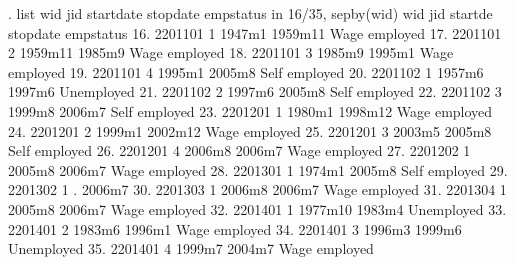 . list wid jid startdate stopdate empstatus in 16/35, sepby(wid)
{\smallskip}
     {\TLC}
     {\VBAR}     wid   jid   startd{\tytilde}e   stopdate       empstatus {\VBAR}
     {\LFTT}
 16. {\VBAR} 2201101     1     1947m1    1959m11   Wage employed {\VBAR}
 17. {\VBAR} 2201101     2    1959m11     1985m9   Wage employed {\VBAR}
 18. {\VBAR} 2201101     3     1985m9     1995m1   Wage employed {\VBAR}
 19. {\VBAR} 2201101     4     1995m1     2005m8   Self employed {\VBAR}
     {\LFTT}
 20. {\VBAR} 2201102     1     1957m6     1997m6      Unemployed {\VBAR}
 21. {\VBAR} 2201102     2     1997m6     2005m8   Self employed {\VBAR}
 22. {\VBAR} 2201102     3     1999m8     2006m7   Self employed {\VBAR}
     {\LFTT}
 23. {\VBAR} 2201201     1     1980m1    1998m12   Wage employed {\VBAR}
 24. {\VBAR} 2201201     2     1999m1    2002m12   Wage employed {\VBAR}
 25. {\VBAR} 2201201     3     2003m5     2005m8   Self employed {\VBAR}
 26. {\VBAR} 2201201     4     2006m8     2006m7   Wage employed {\VBAR}
     {\LFTT}
 27. {\VBAR} 2201202     1     2005m8     2006m7   Wage employed {\VBAR}
     {\LFTT}
 28. {\VBAR} 2201301     1     1974m1     2005m8   Self employed {\VBAR}
     {\LFTT}
 29. {\VBAR} 2201302     1          .     2006m7                 {\VBAR}
     {\LFTT}
 30. {\VBAR} 2201303     1     2006m8     2006m7   Wage employed {\VBAR}
     {\LFTT}
 31. {\VBAR} 2201304     1     2005m8     2006m7   Wage employed {\VBAR}
     {\LFTT}
 32. {\VBAR} 2201401     1    1977m10     1983m4      Unemployed {\VBAR}
 33. {\VBAR} 2201401     2     1983m6     1996m1   Wage employed {\VBAR}
 34. {\VBAR} 2201401     3     1996m3     1999m6      Unemployed {\VBAR}
 35. {\VBAR} 2201401     4     1999m7     2004m7   Wage employed {\VBAR}
     {\BLC}
